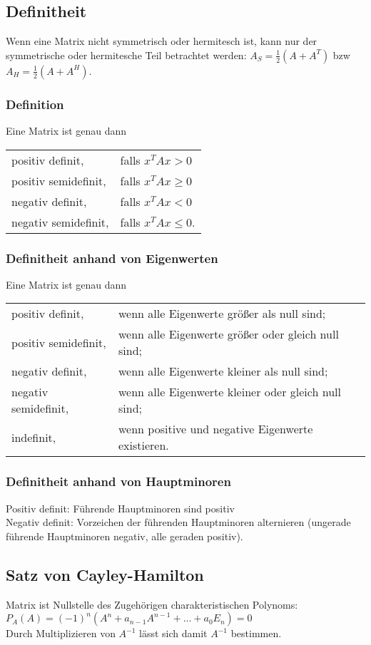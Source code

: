 \documentclass[a4paper]{article}
\begin{document}
\subsection{Definitheit}
Wenn eine Matrix nicht symmetrisch oder hermitesch ist, kann nur der symmetrische oder
hermitesche Teil betrachtet werden: $A_S=\frac{1}{2} (A+A^T)$ bzw $A_H=\frac{1}{2}(A+A^H)$.

\subsubsection{Definition}
Eine Matrix ist genau dann\\
\begin{tabular}{l l}
    positiv definit,	    &falls $x^{T}Ax>0$\\
    positiv semidefinit,	&falls  $x^{T}Ax\geq 0$\\
    negativ definit,	    &falls  $x^{T}Ax<0$\\
    negativ semidefinit,	&falls  $x^{T}Ax\leq 0$.
\end{tabular}

\subsubsection{Definitheit anhand von Eigenwerten}
Eine Matrix ist genau dann\\
\begin{tabular}{l l}
    positiv definit,        &wenn alle Eigenwerte größer als null sind;\\
    positiv semidefinit,	&wenn alle Eigenwerte größer oder gleich null sind;\\
    negativ definit,        &wenn alle Eigenwerte kleiner als null sind;\\
    negativ semidefinit,	&wenn alle Eigenwerte kleiner oder gleich null sind;\\
    indefinit,	            &wenn positive und negative Eigenwerte existieren.
\end{tabular}

\subsubsection{Definitheit anhand von Hauptminoren}
Positiv definit: Führende Hauptminoren sind positiv\\
Negativ definit: Vorzeichen der führenden Hauptminoren alternieren
(ungerade führende Hauptminoren negativ, alle geraden positiv).

\subsection{Satz von Cayley-Hamilton}
Matrix ist Nullstelle des Zugehörigen charakteristischen Polynoms:\\
$P_A(A) = (-1)^n(A^n + a_{n-1}A^{n-1}+\dots+a_0E_n)=0$\\
Durch Multiplizieren von $A^{-1}$ lässt sich damit $A^{-1}$ bestimmen.
\end{document}
